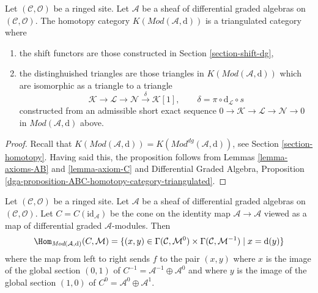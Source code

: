 \begin{proposition}
\label{proposition-homotopy-category-triangulated}
Let $(\mathcal{C}, \mathcal{O})$ be a ringed site.
Let $\mathcal{A}$ be a sheaf of differential graded algebras
on $(\mathcal{C}, \mathcal{O})$.
The homotopy category $K(\textit{Mod}(\mathcal{A}, \text{d}))$
is a triangulated category where
\begin{enumerate}
\item the shift functors are those constructed in
Section \ref{section-shift-dg},
\item the distinghuished triangles are those triangles
in $K(\textit{Mod}(\mathcal{A}, \text{d}))$ which are
isomorphic as a triangle to a triangle
$$
\mathcal{K} \to \mathcal{L} \to \mathcal{N}
\xrightarrow{\delta} \mathcal{K}[1],\quad\quad
\delta = \pi \circ \text{d}_\mathcal{L} \circ s
$$
constructed from an admissible short exact sequence
$0 \to \mathcal{K} \to \mathcal{L} \to \mathcal{N} \to 0$
in $\textit{Mod}(\mathcal{A}, \text{d})$ above.
\end{enumerate}
\end{proposition}

\begin{proof}
Recall that $K(\textit{Mod}(\mathcal{A}, \text{d})) =
K(\textit{Mod}^{dg}(\mathcal{A}, \text{d}))$, see
Section \ref{section-homotopy}.
Having said this, the proposition
follows from Lemmas \ref{lemma-axioms-AB} and \ref{lemma-axiom-C}
and
Differential Graded Algebra, Proposition
\ref{dga-proposition-ABC-homotopy-category-triangulated}.
\end{proof}

\begin{remark}
\label{remark-cone-identity}
Let $(\mathcal{C}, \mathcal{O})$ be a ringed site.
Let $\mathcal{A}$ be a sheaf of differential graded algebras
on $(\mathcal{C}, \mathcal{O})$. Let $C = C(\text{id}_\mathcal{A})$
be the cone on the identity map $\mathcal{A} \to \mathcal{A}$ viewed
as a map of differential graded $\mathcal{A}$-modules.
Then
$$
\Hom_{\textit{Mod}(\mathcal{A}, \text{d})}(C, \mathcal{M}) =
\{(x, y) \in
\Gamma(\mathcal{C}, \mathcal{M}^0) \times
\Gamma(\mathcal{C}, \mathcal{M}^{-1}) \mid
x = \text{d}(y)\}
$$
where the map from left to right sends $f$ to the pair $(x, y)$
where $x$ is the image of the global section $(0, 1)$ of
$C^{-1} = \mathcal{A}^{-1} \oplus \mathcal{A}^0$ and where
$y$ is the image of the global section $(1, 0)$ of
$C^0 = \mathcal{A}^0 \oplus \mathcal{A}^1$.
\end{remark}


